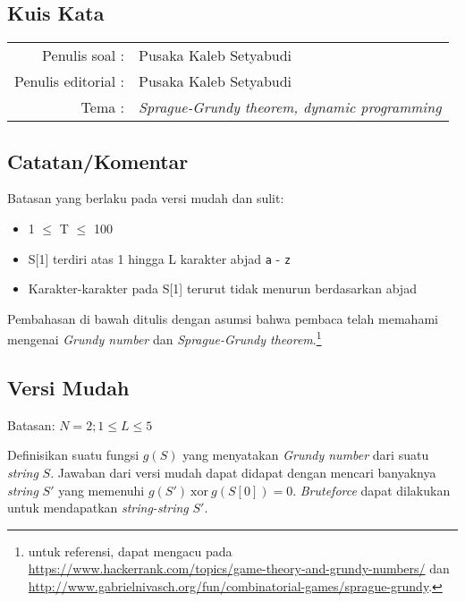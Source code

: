 \documentclass[../main_editorial.tex]{subfiles} %
\newcommand{\problemName}{Kuis Kata}
\newcommand{\problemWriter}{Pusaka Kaleb Setyabudi}
\newcommand{\problemEditorialWriter}{Pusaka Kaleb Setyabudi}
\newcommand{\problemTags}{\textit{Sprague-Grundy theorem, dynamic programming}}
\begin{document}
\begin{center}
    \section*{\problemName}
    \addcontentsline{toc}{section}{\problemName} %
    
    \begin{tabular}{rl}
    Penulis soal : & \problemWriter \\
    Penulis editorial : & \problemEditorialWriter \\
    Tema : & \problemTags
    \end{tabular}
\end{center}

\subsection*{Catatan/Komentar}

Batasan yang berlaku pada versi mudah dan sulit:

\begin{itemize}
	\item 1 $ \leq $ T $ \leq $ 100
	\item S[1] terdiri atas 1 hingga L karakter abjad \texttt{a} - \texttt{z}
	\item Karakter-karakter pada S[1] terurut tidak menurun berdasarkan abjad
\end{itemize}

Pembahasan di bawah ditulis dengan asumsi bahwa pembaca telah memahami mengenai \textit{Grundy number} dan \textit{Sprague-Grundy theorem}.\footnote{untuk referensi, dapat mengacu pada \url{https://www.hackerrank.com/topics/game-theory-and-grundy-numbers/} dan \url{http://www.gabrielnivasch.org/fun/combinatorial-games/sprague-grundy}.}

\subsection*{Versi Mudah}
Batasan: $ N = 2; 1 \le L \le 5 $

Definisikan suatu fungsi $ g(S) $ yang menyatakan \textit{Grundy number} dari suatu \textit{string} $ S $. Jawaban dari versi mudah dapat didapat dengan mencari banyaknya \textit{string} $ S' $ yang memenuhi $ g(S')\ \mathrm{xor}\ g(S[0]) = 0 $. \textit{Bruteforce} dapat dilakukan untuk mendapatkan \textit{string-string} $ S' $.
\end{document}
